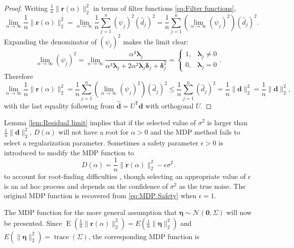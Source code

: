 \documentclass[12pt]{article}
\newcommand{\dVec}{\mathbf{d}}	%
\newcommand{\rVec}{\mathbf{r}}	%
\newcommand{\trans}[1]{{#1}^\mathsf{T}}	%
\DeclareMathOperator{\trace}{trace}		%
\newcommand{\dft}[1]{\widehat{#1}}	%
\newcommand{\regparam}{\alpha}
\newcommand{\mfilt}{\psi}
\newcommand{\noise}{\eta}	%
\newcommand{\noiseSD}{\sigma}	%
\newcommand{\noiseVec}{\bm{\noise}}	%
\DeclareMathOperator{\E}{E}	%
\newcommand{\zeroVec}{\bm{0}}	%
\newcommand{\svd}[1]{\widehat{#1}}	%
\newcommand{\D}{D}	%
\newcommand{\safeparam}{\epsilon}	%
\begin{document}
\begin{proof}
Writing $\frac{1}{n}\|\rVec(\regparam)\|_2^2$ in terms of filter functions \eqref{eq:Filter functions},
\[\lim_{\regparam\rightarrow\infty} \frac{1}{n}\|\rVec(\regparam)\|_2^2 = \lim_{\regparam\rightarrow\infty} \frac{1}{n} \sum_{j=1}^{n} \left(\mfilt_j\right)^2\left(\dft{d}_j\right)^2 = \frac{1}{n} \sum_{j=1}^{n} \left(\lim_{\regparam\rightarrow\infty}\left(\mfilt_j\right)^2\right)\left(\dft{d}_j\right)^2.\]
Expanding the denominator of $\left(\mfilt_j\right)^2$ makes the limit clear:
\[\lim_{\regparam\rightarrow\infty} \left(\mfilt_j\right)^2 = \lim_{\regparam\rightarrow\infty}\frac{\regparam^4\bm{\lambda}_j}{\regparam^4\bm{\lambda}_j + 2\regparam^2\bm{\lambda}_j\bm{\delta}_j + \bm{\delta}_j^2} = \begin{cases}
1, & \bm{\lambda}_j \neq 0 \\
0, & \bm{\lambda}_j = 0
\end{cases}.\]
Therefore
\[\lim_{\regparam\rightarrow\infty} \frac{1}{n}\|\rVec(\regparam)\|_2^2 = \frac{1}{n} \sum_{j=1}^{n} \left(\lim_{\regparam\rightarrow\infty}\left(\mfilt_j\right)^2\right)\left(\dft{d}_j\right)^2 \leq \frac{1}{n} \sum_{j=1}^{n} \left(\dft{d}_j\right)^2 = \frac{1}{n}\|\svd{\dVec}\|_2^2 = \frac{1}{n}\|\dVec\|_2^2,\]
with the last equality following from $\svd{\dVec} = \trans{U}\dVec$ with orthogonal $U$.
\end{proof}
\noindent Lemma \ref{lem:Residual limit} implies that if the selected value of $\noiseSD^2$ is larger than $\frac{1}{n}\|\dVec\|_2^2$, $\D(\regparam)$ will not have a root for $\regparam > 0$ and the MDP method fails to select a regularization parameter. Sometimes a safety parameter $\safeparam > 0$ is introduced to modify the MDP function to
\begin{equation}
\label{eq:MDP Safety}
\D(\regparam) = \frac{1}{n}\|\rVec(\regparam)\|_2^2 - \safeparam\noiseSD^2.
\end{equation}
to account for root-finding difficulties \cite{ABT,IRTools}, though selecting an appropriate value of $\safeparam$ is an ad hoc process and depends on the confidence of $\noiseSD^2$ as the true noise. The original MDP function is recovered from \eqref{eq:MDP Safety} when $\safeparam = 1$. \par
The MDP function for the more general assumption that $\noiseVec \sim \mathcal{N}(\zeroVec,\Sigma)$ will now be presented. Since $\E(\frac{1}{n}\|\rVec(\regparam)\|_2^2) = E(\frac{1}{n}\|\noiseVec\|_2^2)$ and $E(\|\noiseVec\|_2^2) = \trace(\Sigma)$, the corresponding MDP function is
\end{document}
